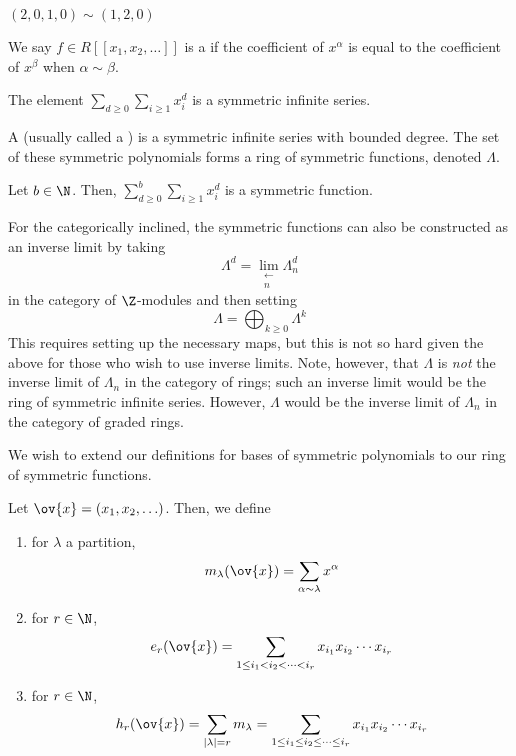 \documentclass[11pt,leqno,oneside]{amsart}
\numberwithin{thm}{section}
\newcommand{\sym}{\Lambda}
\begin{document}
\begin{example}
  \((2,0,1,0) \sim (1,2,0)\)
\end{example}
\begin{defn}
  We say \(f \in R[[x_1, x_2, \ldots]]\)  is a  if the coefficient of \(x^\alpha\) is equal to the
  coefficient of \(x^\beta\) when \(\alpha \sim \beta\).
\end{defn}
\begin{example}
  The element \(\displaystyle \sum_{d \geq 0} \sum_{i \geq 1} x_i^d\) is a symmetric
  infinite series.
\end{example}
\begin{defn}
  A  (usually called
  a ) is a symmetric infinite series with bounded
  degree. The set of these symmetric polynomials forms a ring of
  symmetric functions, denoted \(\Lambda\).
\end{defn}
\begin{example}
  Let \(b \in \N\). Then, \(\displaystyle \sum_{d \geq 0}^b \sum_{i \geq 1} x_i^d\)
  is a symmetric function.
\end{example}
\begin{rmk}
  For the categorically inclined, the symmetric functions can also be
  constructed as an inverse limit 
  by taking \[
    \sym^d = \lim_{\substack{\leftarrow \\ n}} \sym_n^d
  \]
  in the category of \(\Z\)-modules and then setting \[
    \sym = \bigoplus_{k \geq 0} \sym^k
  \]
  This requires setting up the necessary maps, but this is not so hard
  given the above for those who wish to use inverse limits. Note,
  however, that \(\sym\) is \emph{not} the inverse limit of 
  \(\sym_n\) in the category of rings; such an inverse limit would be
  the ring of symmetric infinite series. However, \(\sym\) would be
  the inverse limit of \(\sym_n\) in the category of graded rings.
\end{rmk}
We wish to extend our definitions for bases of symmetric polynomials
to our ring of symmetric functions.
\begin{defn}
  Let \(\ov{x} = (x_1, x_2, \ldots)\). Then, we define
  \begin{enumerate}
  \item for \(\lambda\) a partition, \[
      m_\lambda(\ov{x}) = \sum_{\alpha \sim \lambda} x^\alpha
    \]
  \item for \(r \in \N\), \[
      e_r(\ov{x}) = \sum_{1 \leq i_1 < i_2 < \cdots < i_r}
      x_{i_1} x_{i_2} \cdots x_{i_r}
    \]
  \item for \(r \in \N\), \[
      h_r(\ov{x}) = \sum_{|\lambda|=r} m_\lambda = \sum_{1 \leq i_1
        \leq i_2 \leq \cdots \leq i_r} x_{i_1} x_{i_2} \cdots x_{i_r}
    \]
  \end{enumerate}
\end{defn}
\end{document}
